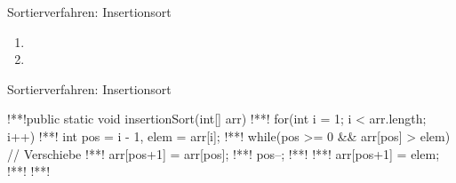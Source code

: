 \begin{frame}{Sortierverfahren: Insertionsort}
\begin{center}
\begin{minipage}{0.9\linewidth}
\begin{multicols}{2}
\begin{enumerate}[<+(1)->]
        \item {}
        \item {}
    \end{enumerate}
\end{multicols}
\end{minipage}
    \end{center}
\end{frame}

\begin{frame}[fragile,c]{Sortierverfahren: Insertionsort}
    \begin{plainjava}
!**!public static void insertionSort(int[] arr) {
!**!    for(int i = 1; i < arr.length; i++) {
!**!        int pos = i - 1, elem = arr[i];
!**!        while(pos >= 0 && arr[pos] > elem) { // Verschiebe
!**!            arr[pos+1] = arr[pos];
!**!            pos--;
!**!        }
!**!        arr[pos+1] = elem;
!**!    }
!**!}
    \end{plainjava}
\end{frame}



\def\List#1#2{
    \foreach[count=\i,remember=\i as \li(initially 0)] \n in {#1}{
        \ifnum\i<#2
            \node[inner sep=4pt,ball,outer sep=2pt] (\i) at(1.25*\i,0) {\n};
        \else
            \node[inner sep=4pt,iball,outer sep=2pt] (\i) at(1.25*\i,0) {\n};
        \fi
        \ifnum\i>1
            \draw (\li.east) -- (\i.west);
        \fi
    }
}

